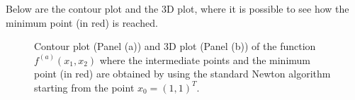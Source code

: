 \documentclass[a4paper,11pt]{article}
\begin{document}
	\noindent Below are the contour plot and the 3D plot, where it is possible to see how the minimum point (in red) is reached.
	\begin{figure}[H]
		\centering
		 \quad
		\caption{Contour plot (Panel (a)) and 3D plot (Panel (b)) of the function $f^{(a)}(x_{1},x_{2})$ where the intermediate points and the minimum point (in red) are obtained by using the standard Newton algorithm starting from the point $x_{0}=(1,1)^{T}$.}
		\label{Fig:func_a}
	\end{figure}
\end{document}
